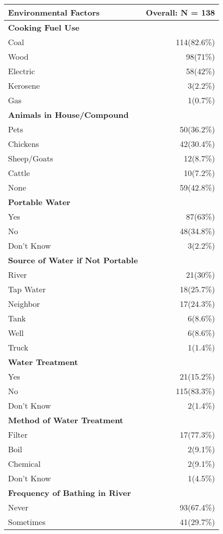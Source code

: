 \documentclass[4pt,letterpaper]{article}
\begin{document}
\begin{multicols}{2}
\begin{center}
\begin{tabular}{p{5cm}r}
\toprule
\textbf{Environmental Factors} & \textbf{Overall: N = 138} \\
\midrule
\textbf{Cooking Fuel Use} & \\
Coal & 114(82.6\%) \\
Wood & 98(71\%) \\
Electric & 58(42\%) \\
Kerosene & 3(2.2\%) \\
Gas & 1(0.7\%) \\
\midrule
\textbf{Animals in House/Compound} & \\
Pets & 50(36.2\%) \\
Chickens & 42(30.4\%) \\
Sheep/Goats & 12(8.7\%) \\
Cattle & 10(7.2\%) \\
None & 59(42.8\%) \\
\midrule
\textbf{Portable Water} & \\
Yes & 87(63\%) \\
No & 48(34.8\%) \\
Don't Know & 3(2.2\%) \\
\midrule
\textbf{Source of Water if Not Portable} & \\
River & 21(30\%) \\
Tap Water & 18(25.7\%) \\
Neighbor & 17(24.3\%) \\
Tank & 6(8.6\%) \\
Well & 6(8.6\%) \\
Truck & 1(1.4\%) \\
\midrule
\textbf{Water Treatment} & \\
Yes & 21(15.2\%) \\
No & 115(83.3\%) \\
Don't Know & 2(1.4\%) \\
\midrule
\textbf{Method of Water Treatment} & \\
Filter & 17(77.3\%) \\
Boil & 2(9.1\%) \\
Chemical & 2(9.1\%) \\
Don't Know & 1(4.5\%) \\
\midrule
\textbf{Frequency of Bathing in River} & \\
Never & 93(67.4\%) \\
Sometimes & 41(29.7\%) \\

\end{tabular}
\end{center}
\end{multicols}
\end{document}
